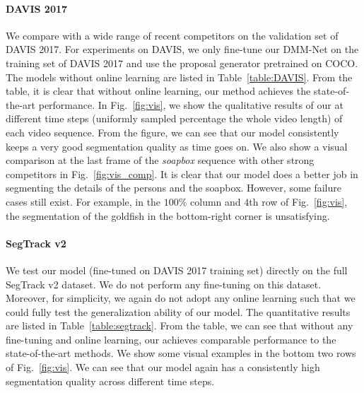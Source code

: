 \paragraph{DAVIS 2017}
We compare with a wide range of recent competitors on the validation set of DAVIS 2017. For experiments on DAVIS, we only fine-tune our DMM-Net on the training set of DAVIS 2017 and use the proposal generator pretrained on COCO. 
The models without online learning are listed in Table~\ref{table:DAVIS}. 
From the table, it is clear that without online learning, our method achieves the state-of-the-art performance.
In Fig.~\ref{fig:vis}, we show the qualitative results of our {\ourmodelshort} at different time steps (uniformly sampled percentage \wrt the whole video length) of each video sequence.
From the figure, we can see that our model consistently keeps a very good segmentation quality as time goes on.
We also show a visual comparison at the last frame of the \textit{soapbox} sequence with other strong competitors in Fig.~\ref{fig:vis_comp}.
It is clear that our model does a better job in segmenting the details of the persons and the soapbox.
However, some failure cases still exist. 
For example, in the $100\%$ column and $4$th row of Fig.~\ref{fig:vis}, the segmentation of the goldfish in the bottom-right corner is unsatisfying.

\paragraph{SegTrack v2}
We test our {\ourmodelshort} model (fine-tuned on DAVIS 2017 training set) directly on the full SegTrack v2 dataset.
We do not perform any fine-tuning on this dataset. Moreover, for simplicity, we again do not adopt any online learning such that we could fully test the generalization ability of our model.
The quantitative results are listed in Table~\ref{table:segtrack}.
From the table, we can see that without any fine-tuning and online learning, our {\ourmodelshort} achieves comparable performance to the state-of-the-art methods.
We show some visual examples in the bottom two rows of Fig.~\ref{fig:vis}.
We can see that our model again has a consistently high segmentation quality across different time steps.


